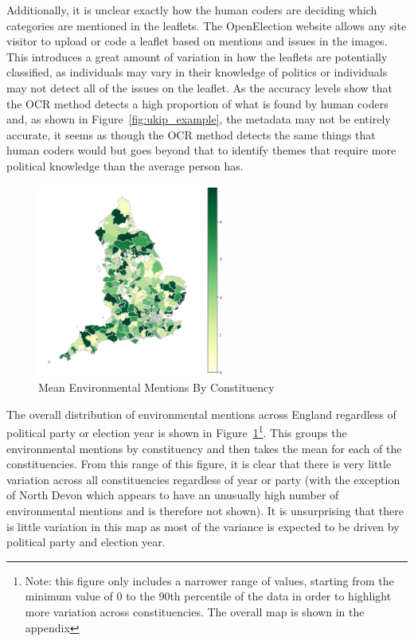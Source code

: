 \documentclass[preprint]{elsarticle} %
\begin{document}
Additionally, it is unclear exactly how the human coders are deciding which categories are mentioned in the leaflets. The OpenElection website allows any site visitor to upload or code a leaflet based on mentions and issues in the images. This introduces a great amount of variation in how the leaflets are potentially classified, as individuals may vary in their knowledge of politics or individuals may not detect all of the issues on the leaflet. As the accuracy levels show that the OCR method detects a high proportion of what is found by human coders and, as shown in Figure~\ref{fig:ukip_example}, the metadata may not be entirely accurate, it seems as though the OCR method detects the same things that human coders would but goes beyond that to identify themes that require more political knowledge than the average person has.



\begin{figure}
	\centering
	\includegraphics[width=0.55\textwidth]{overall_env_mentions_new.png}
	\caption{Mean Environmental Mentions By Constituency}
	\label{fig:meanenvbycon}
\end{figure}




The overall distribution of environmental mentions across England regardless of political party or election year is shown in Figure~\ref{fig:meanenvbycon}\footnote{Note: this figure only includes a narrower range of values, starting from the minimum value of 0 to the 90th percentile of the data in order to highlight more variation across constituencies. The overall map is shown in the appendix}. This groups the environmental mentions by constituency and then takes the mean for each of the constituencies. From this range of this figure, it is clear that there is very little variation across all constituencies regardless of year or party (with the exception of North Devon which appears to have an unusually high number of environmental mentions and is therefore not shown). It is unsurprising that there is little variation in this map as most of the variance is expected to be driven by political party and election year. 
\end{document}
